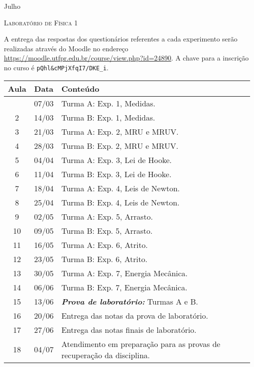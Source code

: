 %
\begin{marginfigure}
    \centering
    Julho\\
\end{marginfigure}
\vspace{1cm}
\begin{center}
\Large\textsc{Laboratório de Física 1}
\end{center}

A entrega das respostas dos questionários referentes a cada experimento serão realizadas através do Moodle no endereço \url{https://moodle.utfpr.edu.br/course/view.php?id=24890}. A chave para a inscrição no curso é \verb|pQhl&cMPjXfqI7/DKE_i|.
\begin{center}
\begin{longtable}{ccp{70mm}}
\toprule
Aula & Data & Conteúdo \\
\midrule
\endhead
\bottomrule
\endfoot
 1 & 07/03 & Turma A: Exp. 1, Medidas. \\
 2 & 14/03 & Turma B: Exp. 1, Medidas. \\
 3 & 21/03 & Turma A: Exp. 2, MRU e MRUV. \\
 4 & 28/03 & Turma B: Exp. 2, MRU e MRUV. \\ 
 5 & 04/04 & Turma A: Exp. 3, Lei de Hooke. \\
 6 & 11/04 & Turma B: Exp. 3, Lei de Hooke. \\
 7 & 18/04 & Turma A: Exp. 4, Leis de Newton. \\
 8 & 25/04 & Turma B: Exp. 4, Leis de Newton. \\
 9 & 02/05 & Turma A: Exp. 5, Arrasto. \\
10 & 09/05 & Turma B: Exp. 5, Arrasto. \\
11 & 16/05 & Turma A: Exp. 6, Atrito. \\
12 & 23/05 & Turma B: Exp. 6, Atrito. \\
13 & 30/05 & Turma A: Exp. 7, Energia Mecânica. \\
14 & 06/06 & Turma B: Exp. 7, Energia Mecânica. \\
15 & 13/06 & \textbf{\textit{Prova de laboratório:}} Turmas A e B. \\
16 & 20/06 & Entrega das notas da prova de laboratório. \\
17 & 27/06 & Entrega das notas finais de laboratório. \\
18 & 04/07 & Atendimento em preparação para as provas de recuperação da disciplina.
\end{longtable}
\end{center}


